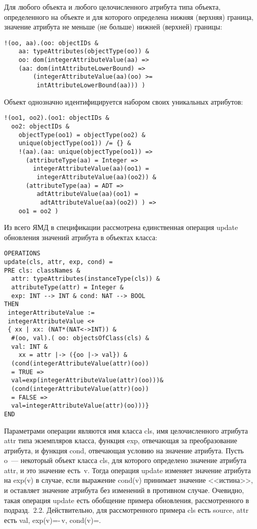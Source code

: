 \begin{multicols}{2}
        Для любого объекта и любого целочисленного атрибута типа объекта, 
определенного на объекте и для которого определена нижняя (верхняя) 
граница, значение атрибута не меньше (не больше) нижней (верхней) границы:
        \begin{verbatim}
!(oo, aa).(oo: objectIDs & 
    aa: typeAttributes(objectType(oo)) &
    oo: dom(integerAttributeValue(aa) => 
    (aa: dom(intAttributeLowerBound) =>
        (integerAttributeValue(aa)(oo) >= 
         intAttributeLowerBound(aa))) ) 
\end{verbatim}

        Объект однозначно идентифицируется набором своих уникальных 
атрибутов:
        \begin{verbatim}
!(oo1, oo2).(oo1: objectIDs & 
  oo2: objectIDs &
    objectType(oo1) = objectType(oo2) & 
    unique(objectType(oo1)) /= {} &
    !(aa).(aa: unique(objectType(oo1)) => 
      (attributeType(aa) = Integer =>
        integerAttributeValue(aa)(oo1) =
         integerAttributeValue(aa)(oo2)) &
      (attributeType(aa) = ADT =>
         adtAttributeValue(aa)(oo1) =
          adtAttributeValue(aa)(oo2)) ) => 
    oo1 = oo2 )
\end{verbatim}

        Из всего ЯМД в спецификации рассмотрена единственная операция 
{\sf update} обновления значений атрибута в объектах класса:
        \begin{verbatim}
OPERATIONS
update(cls, attr, exp, cond) =
PRE cls: classNames & 
  attr: typeAttributes(instanceType(cls)) &
  attributeType(attr) = Integer &
  exp: INT --> INT & cond: NAT --> BOOL
THEN
 integerAttributeValue := 
 integerAttributeValue <+ 
 { xx | xx: (NAT*(NAT<->INT)) &
  #(oo, val).( oo: objectsOfClass(cls) & 
  val: INT &
    xx = attr |-> ({oo |-> val}) & 
  (cond(integerAttributeValue(attr)(oo)) 
  = TRUE =>
  val=exp(integerAttributeValue(attr)(oo)))&
  (cond(integerAttributeValue(attr)(oo)) 
  = FALSE => 
  val=integerAttributeValue(attr)(oo)))}
END
\end{verbatim}

        Параметрами операции являются имя класса {\sf cls}, имя целочисленного 
атрибута {\sf attr} типа экземпляров класса, функция {\sf exp}, отвечающая за 
преобразование атрибута, и функция {\sf cond}, отвечающая условию на значение 
атрибута. Пусть {\sf o}~--- некоторый объект класса {\sf cls}, для которого определено 
значение атрибута {\sf attr}, и это значение есть~{\sf v}. Тогда операция {\sf update} 
изменяет значение атрибута на {\sf exp(v)} в случае, если выражение {\sf cond(v)} 
принимает значение <<истина>>, и оставляет значение атрибута без изменений в 
противном случае. Очевидно, такая операция {\sf update} есть обобщение примера 
обновления, рассмотренного в подразд.~2.2. Действительно, для рассмотренного 
примера {\sf cls} есть {\sf source}, {\sf attr} есть {\sf val}, 
{\sf exp(v)}\;=\;-\,{\sf v}, {\sf cond(v)}\;=.
        

\end{multicols}
